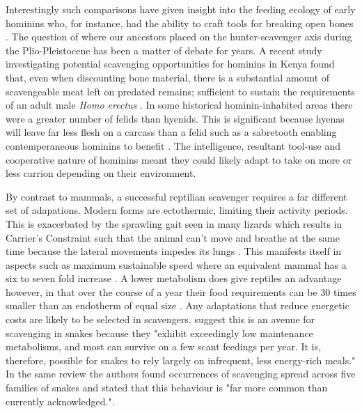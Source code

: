 \documentclass[a4paper,12pt]{article}
\begin{document}
Interestingly such comparisons have given insight into the feeding ecology of early hominins who, for instance, had the ability to craft tools for breaking open bones \citep{hone2010feeding,ARCM:ARCM12084}. The question of where our ancestors placed on the hunter-scavenger axis during the Plio-Pleistocene has been a matter of debate for years. A recent study investigating potential scavenging opportunities for hominins in Kenya found that, even when discounting bone material, there is a substantial amount of scavengeable meat left on predated remains; sufficient to sustain the requirements of an adult male \textit{Homo erectus} \citep{pobiner2015new}. In some historical hominin-inhabited areas there were a greater number of felids than hyenids. This is significant because hyenas will leave far less flesh on a carcass than a felid such as a sabretooth enabling contemperaneous hominins to benefit \citep{pobiner2015new}. The intelligence, resultant tool-use and cooperative nature of hominins meant they could likely adapt to take on more or less carrion depending on their environment. 

By contrast to mammals, a successful reptilian scavenger requires a far different set of adapations. Modern forms are ectothermic, limiting their activity periods. This is exacerbated by the sprawling gait seen in many lizards which results in Carrier's Constraint such that the animal can't move and breathe at the same time because the lateral movements impedes its lungs \citep{carrier1987evolution}. This manifests itself in aspects such as maximum sustainable speed where an equivalent mammal has a six to seven fold increase \citep{ruben1995evolution}. A lower metabolism does give reptiles an advantage however, in that over the course of a year their food requirements can be 30 times smaller than an endotherm of equal size \citep{Nagy1621}. Any adaptations that reduce energetic costs are likely to be selected in scavengers. \cite{devault2002scavenging} suggest this is an avenue for scavenging in snakes because they "exhibit  exceedingly  low  maintenance  metabolisms,  and most  can  survive  on  a  few  scant  feedings per year. It  is, therefore, possible for snakes to rely largely  on  infrequent,  less  energy-rich  meals." In the same review the authors found occurrences of scavenging spread across five families of snakes and stated that this behaviour is "far more common than currently acknowledged."\citep{devault2002scavenging}. 
\end{document}
